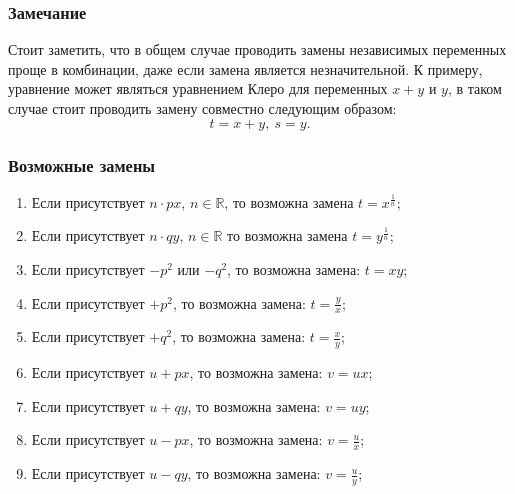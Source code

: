 		\vspace{20pt}
		\subsubsection*{Замечание}
			Стоит заметить, что в общем случае проводить замены независимых переменных проще в комбинации, даже если замена является незначительной. К примеру, уравнение может являться уравнением Клеро для переменных $x + y$ и $y$, в таком случае стоит проводить замену совместно следующим образом: 
			\[ t = x + y, ~ s = y. \]

		\subsubsection*{Возможные замены}
			\begin{enumerate}
				\item Если присутствует $n \cdot px$, $n \in \mathbb{R}$, то возможна замена \( t = x^{\frac{1}{n}} \);
				\item Если присутствует $n \cdot qy$, $n \in \mathbb{R}$ то возможна замена \( t = y^{\frac{1}{n}} \);
				\item Если присутствует $- p^2$ или $- q^2$, то возможна замена: \( t = xy \);
				\item Если присутствует $+ p^2$, то возможна замена: \( t = \frac{y}{x} \);
				\item Если присутствует $+ q^2$, то возможна замена: \( t = \frac{x}{y} \);
				\item Если присутствует $u + px$, то возможна замена: \( v = ux \);
				\item Если присутствует $u + qy$, то возможна замена: \( v = uy \);
				\item Если присутствует $u - px$, то возможна замена: \( v = \frac{u}{x} \);
				\item Если присутствует $u - qy$, то возможна замена: \( v = \frac{u}{y} \);
			\end{enumerate}


